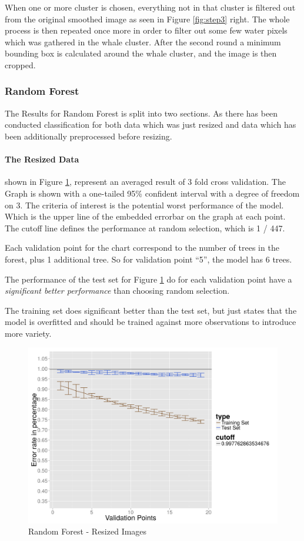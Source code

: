 When one or more cluster is chosen, everything not in that cluster is filtered out from the original smoothed image as seen in Figure \ref{fig:step3} right. The whole process is then repeated once more in order to filter out some few water pixels which was gathered in the whale cluster.
After the second round a minimum bounding box is calculated around the whale cluster, and the image is then cropped.



\subsubsection{Random Forest}
The Results for Random Forest is split into two sections. As there has been conducted classification for both data which was just resized and data which has been additionally preprocessed before resizing.

\paragraph{The Resized Data}
\label{par:rf-resized}
shown in Figure \ref{fig:rf-resized}, represent an averaged result of 3 fold cross validation. The Graph is shown with a one-tailed 95\% confident interval with a degree of freedom on 3. The criteria of interest is the potential worst performance of the model. Which is the upper line of the embedded errorbar on the graph at each point. The cutoff line defines the performance at random selection, which is 1 / 447. 

Each validation point for the chart correspond to the number of trees in the forest, plus 1 additional tree. So for validation point ``5'', the model has 6 trees.

The performance of the test set for Figure \ref{fig:rf-resized} do for each validation point have a \emph{significant better performance} than choosing random selection.

The training set does significant better than the test set, but just states that the model is overfitted and should be trained against more observations to introduce more variety.

\begin{figure}
  \centering
  \includegraphics[width=0.9\linewidth]{Images/DRFraw}
  \caption{Random Forest - Resized Images}
  \label{fig:rf-resized}
\end{figure}

